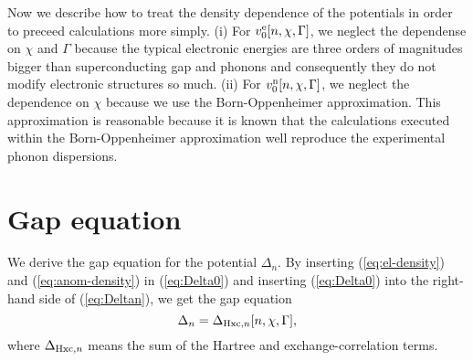 %
Now we describe how to treat the density dependence of the potentials in order to preceed calculations more simply.
(i) For $v^{\rm e}_0[n, \chi, \Gamma]$, we neglect the dependense on $\chi$ and $\Gamma$ because 
the typical electronic energies are three orders of magnitudes bigger than superconducting gap and phonons
and consequently they do not modify electronic structures so much.
(ii) For $v^{\rm n}_0[n, \chi, \Gamma]$, we neglect the dependence on $\chi$ because
we use the Born-Oppenheimer approximation. This approximation is reasonable because
it is known that the calculations executed within the Born-Oppenheimer approximation well reproduce
the experimental phonon dispersions\cite{Baroni2001}.

\section{Gap equation}
%
We derive the gap equation for the potential $\Delta_n$. By inserting (\ref{eq:el-density}) 
and (\ref{eq:anom-density}) in (\ref{eq:Delta0}) and inserting (\ref{eq:Delta0}) into the 
right-hand side of (\ref{eq:Deltan}), we get the gap equation
%
\begin{equation}
	\Delta_n = \Delta_{{\rm Hxc}, n}[n, \chi, \Gamma],
	\label{eq:Delta_gap}
\end{equation}
%
where $\Delta_{{\rm Hxc},n}$ means the sum of the Hartree and exchange-correlation terms.

